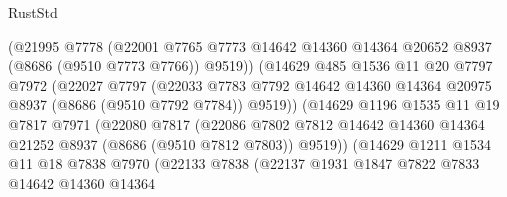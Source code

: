 \begin{lexlean}{RustStd}
\begin{coremodule}
                          (@21995
                            @7778
                            (@22001
                              @7765
                              @7773
                              @14642
                              @14360
                              @14364
                              @20652
                              @8937
                              (@8686 (@9510 @7773 @7766))
                              @9519))
                          (@14629
                            @485
                            @1536
                            @11
                            @20
                            @7797
                            @7972
                            (@22027
                              @7797
                              (@22033
                                @7783
                                @7792
                                @14642
                                @14360
                                @14364
                                @20975
                                @8937
                                (@8686 (@9510 @7792 @7784))
                                @9519))
                            (@14629
                              @1196
                              @1535
                              @11
                              @19
                              @7817
                              @7971
                              (@22080
                                @7817
                                (@22086
                                  @7802
                                  @7812
                                  @14642
                                  @14360
                                  @14364
                                  @21252
                                  @8937
                                  (@8686 (@9510 @7812 @7803))
                                  @9519))
                              (@14629
                                @1211
                                @1534
                                @11
                                @18
                                @7838
                                @7970
                                (@22133
                                  @7838
                                  (@22137
                                    @1931
                                    @1847
                                    @7822
                                    @7833
                                    @14642
                                    @14360
                                    @14364

\end{coremodule}
\end{lexlean}
